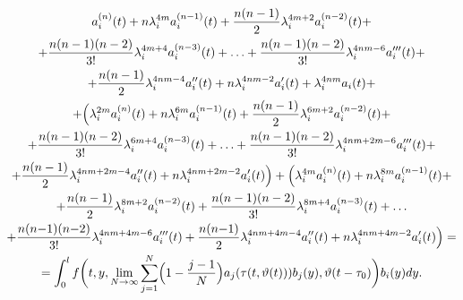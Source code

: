 \begin{multline}
\label{uld:eq10}
a_i^{(n)} (t)+n \lambda _i^{ 4 m}  a_i^{ (n-1)}
(t)+\frac{n (n-1)}{2} \lambda _i^{4 m+2} a_i^{(n-2)} (t)+
\\
+ \frac{n (n-1) (n-2)}{3!} \lambda_i^{4 m+4} a_i^{(n-3)}
(t) + \ldots +\frac{n (n-1) (n-2)}{3!} \lambda_i^{ 4 n m-6}   a_i''' (t)+
\\
+ \frac{n (n-1)}{2} \lambda_i^{ 4 n m-4}  a_i ''(t)+n\lambda _i^{ 4 n m-2}  a_i '(t)+ \lambda
_i^{ 4 n m}  a_i  (t)+
\\
+ \Bigl( \lambda _i^{ 2 m} a_i^{(n)} (t)+n \lambda_i^{6 m}  a_i^{(n-1)} (t)+ 
\frac{n (n-1)}{2} \lambda _i^{ 6 m+2}  a_i^{ (n-2)}
(t) + \\ + \frac{n (n-1) (n-2)}{3!} \lambda _i^{ 6 m+4}
 a_i^{ (n-3)} (t) + \ldots +\frac{n (n-1) (n-2)}{3!} \lambda _i^{ 4 n m+2
m-6}  a_i'''(t)+
\\
+ \frac{n (n-1)}{2} \lambda_i^{4 n  m+2 m-4}
 a_i''(t) + n \lambda _i^{ 4 n  m+2 m-2}
 a_i'(t) \Bigr)+
\Bigl( \lambda_i^{4 m} a_i^{(n)} (t) + n \lambda_i^{8 m}  a_i^{(n-1)} (t)+ 
\\
+ \frac{n (n-1)}{2} \lambda_i^{8 m+2}  a_i^{(n-2)} (t)+\frac{n (n-1) (n-2)}{3!} \lambda_i^{ 8 m+4}
a_i^{(n-3)} (t) + \ldots
\\
+ \frac{n (n{-}1) (n{-}2)}{3!} \lambda _i^{4 n m+4 m-6}  a_i'''(t)+ 
\frac{n (n{-}1)}{2} \lambda_i^{4 n  m+4 m-4}  a_{ i}''(t)+n\lambda_i^{4 n  m+4 m-2} a_i'(t)\Bigr)=
\\
=\int_0^l f \biggl( t,y,\lim \limits_{N\to \infty } \sum\limits_{j=1}^N \Bigl(1-\frac{j-1}{N}\Bigr)
a_j(\tau (t,\vartheta(t))) b_j (y),\vartheta (t-\tau_0)
\biggr) b_i (y)  dy.
\end{multline}

